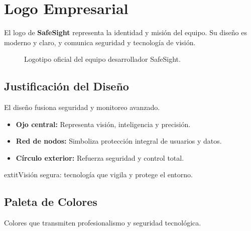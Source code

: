 
\section{Logo Empresarial}

El logo de \textbf{SafeSight} representa la identidad y misión del equipo. Su diseño es moderno y claro, y comunica seguridad y tecnología de visión.

\begin{figure}[h!]
		\centering
		\caption{Logotipo oficial del equipo desarrollador SafeSight.}\label{fig:logo_safesight}
\end{figure}

\subsection*{Justificación del Diseño}

El diseño fusiona seguridad y monitoreo avanzado.

\begin{itemize}
\item \textbf{Ojo central:} Representa visión, inteligencia y precisión.
\item \textbf{Red de nodos:} Simboliza protección integral de usuarios y datos.
\item \textbf{Círculo exterior:} Refuerza seguridad y control total.
\end{itemize}

	extit{Visión segura}: tecnología que vigila y protege el entorno.

\subsection*{Paleta de Colores}

Colores que transmiten profesionalismo y seguridad tecnológica.

